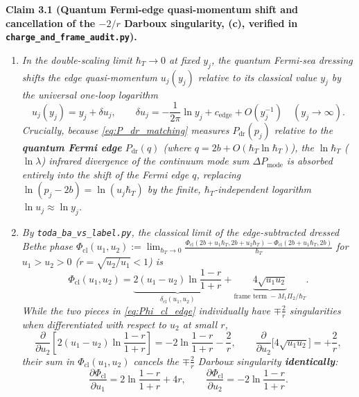 \documentclass[11pt,a4paper]{article}
\newcommand{\hb}{\hbar}
\begin{document}
\medskip\noindent
\textbf{Claim 3.1 (Quantum Fermi-edge quasi-momentum shift and cancellation of the $-2/r$ Darboux singularity, \textbf{(c)}, verified in \texttt{charge\_and\_frame\_audit.py}).}
\begin{enumerate}
\item \emph{In the double-scaling limit $\hb_T\to 0$ at fixed $y_j$, the quantum
Fermi-sea dressing shifts the edge quasi-momentum $u_j(y_j)$ relative to its
classical value $y_j$ by the universal one-loop logarithm}
\begin{equation}
  u_j(y_j) = y_j + \delta u_j, \qquad
  \delta u_j = -\frac{1}{2\pi}\ln y_j + c_{\mathrm{edge}} + O(y_j^{-1}) \quad (y_j \to \infty).
  \label{eq:u_of_y}
\end{equation}
\emph{Crucially, because \eqref{eq:P_dr_matching} measures $P_{\mathrm{dr}}(p_j)$
relative to the \textbf{quantum Fermi edge} $P_{\mathrm{dr}}(q)$ (where
$q = 2b + O(\hb_T\ln\hb_T)$), the $\ln\hb_T$ ($\ln\lambda$) infrared divergence
of the continuum mode sum $\Delta P_{\mathrm{mode}}$ is absorbed entirely into the
shift of the Fermi edge $q$, replacing $\ln(p_j-2b) = \ln(u_j\hb_T)$ by the
finite, $\hb_T$-independent logarithm $\ln u_j \approx \ln y_j$.}
\item \emph{By \texttt{toda\_ba\_vs\_label.py}, the classical limit of the
edge-subtracted dressed Bethe phase
$\Phi_{\mathrm{cl}}(u_1,u_2) := \lim_{\hb_T\to 0}\frac{\Phi_{\mathrm{cl}}(2b+u_1\hb_T,2b+u_2\hb_T)-\Phi_{\mathrm{cl}}(2b+u_1\hb_T,2b)}{\hb_T}$
for $u_1 > u_2 > 0$ ($r = \sqrt{u_2/u_1} < 1$) is}
\begin{equation}
  \Phi_{\mathrm{cl}}(u_1,u_2)
  = \underbrace{2(u_1 - u_2)\ln\frac{1-r}{1+r}}_{\delta_{\mathrm{cl}}(u_1,u_2)}
    + \underbrace{4\sqrt{u_1 u_2}}_{\text{frame term }-M_1\Pi_2/\hb_T}.
  \label{eq:Phi_cl_edge}
\end{equation}
\emph{While the two pieces in \eqref{eq:Phi_cl_edge} individually have $\mp\frac{2}{r}$
singularities when differentiated with respect to $u_2$ at small $r$,}
\begin{equation}
  \frac{\partial}{\partial u_2}\left[2(u_1-u_2)\ln\frac{1-r}{1+r}\right]
  = -2\ln\frac{1-r}{1+r} - \frac{2}{r}, \qquad
  \frac{\partial}{\partial u_2}\big[4\sqrt{u_1 u_2}\big] = +\frac{2}{r},
  \label{eq:darboux_cancellation}
\end{equation}
\emph{their sum in $\Phi_{\mathrm{cl}}(u_1,u_2)$ cancels the $\mp\frac{2}{r}$
Darboux singularity \textbf{identically}:}
\begin{equation}
  \frac{\partial\Phi_{\mathrm{cl}}}{\partial u_1} = 2\ln\frac{1-r}{1+r} + 4r, \qquad
  \frac{\partial\Phi_{\mathrm{cl}}}{\partial u_2} = -2\ln\frac{1-r}{1+r}.
  \label{eq:dPhi_cl_du}
\end{equation}
\end{enumerate}
\end{document}
